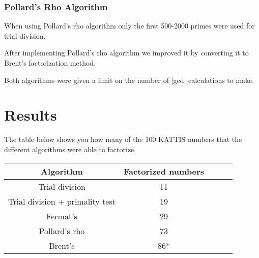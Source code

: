\documentclass[paper=a4, fontsize=11pt,numbers=endperiod]{scrartcl} %
\numberwithin{equation}{section} %
\numberwithin{figure}{section} %
\numberwithin{table}{section} %
\begin{document}
\subsubsection{Pollard's Rho Algorithm}
When using Pollard's rho algorithm only the first 500-2000 primes were used for trial division.


After implementing Pollard's rho algorithm we improved it by converting it to Brent's factorization method.

Both algorithms were given a limit on the number of |gcd| calculations to make. %




\section{Results}

The table below shows you how many of the 100 KATTIS numbers that the different algorithms were able to factorize.

    \begin{tabular}{|c|c|c|c|c|}
    \hline
    \textbf{Algorithm} & \textbf{Factorized numbers} \\ \hline
    Trial division & 11 \\ \hline
    Trial division + primality test & 19 \\ \hline
    Fermat's & 29 \\ \hline
    Pollard's rho & 73 \\ \hline
    Brent's & 86* \\ \hline
    \end{tabular}
    \hspace{10pt}
\end{document}

